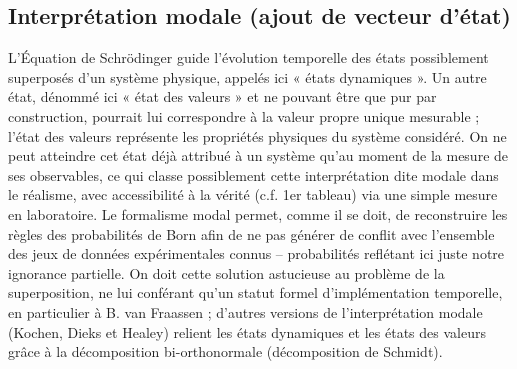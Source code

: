 \subsection{Interprétation modale (ajout de vecteur d’état)}
L’Équation de Schrödinger guide l’évolution temporelle des états possiblement superposés
d’un système physique, appelés ici « états dynamiques ». Un autre état, dénommé ici « état
des valeurs » et ne pouvant être que pur par construction, pourrait lui correspondre à la
valeur propre unique mesurable ; l’état des valeurs représente les propriétés physiques du
système considéré. On ne peut atteindre cet état déjà attribué à un système qu’au moment de
la mesure de ses observables, ce qui classe possiblement cette interprétation dite modale
dans le réalisme, avec accessibilité à la vérité (c.f. 1er tableau) via une simple mesure en
laboratoire. Le formalisme modal permet, comme il se doit, de reconstruire les règles des
probabilités de Born afin de ne pas générer de conflit avec l’ensemble des jeux de données
expérimentales connus – probabilités reflétant ici juste notre ignorance partielle. On doit
cette solution astucieuse au problème de la superposition, ne lui conférant qu’un statut
formel d’implémentation temporelle, en particulier à B. van Fraassen ; d’autres versions de
l’interprétation modale (Kochen, Dieks et Healey) relient les états dynamiques et les états
des valeurs grâce à la décomposition bi-orthonormale (décomposition de Schmidt).
